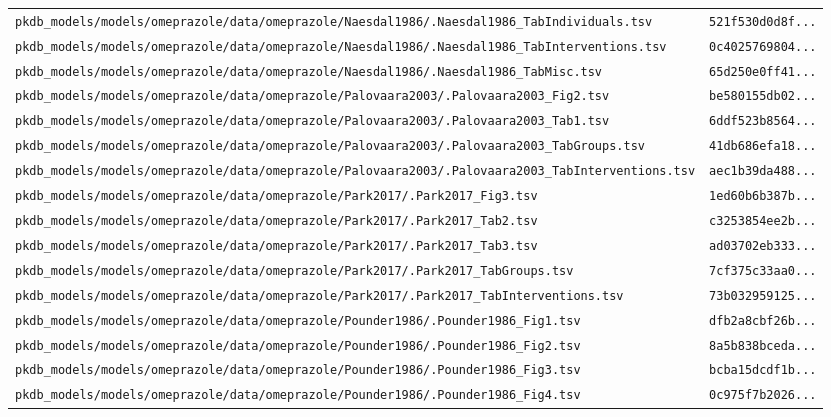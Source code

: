 \begin{longtable}{ll}
\texttt{pkdb\_models/models/omeprazole/data/omeprazole/Naesdal1986/.Naesdal1986\_TabIndividuals.tsv} & \texttt{521f530d0d8f...} \\
\texttt{pkdb\_models/models/omeprazole/data/omeprazole/Naesdal1986/.Naesdal1986\_TabInterventions.tsv} & \texttt{0c4025769804...} \\
\texttt{pkdb\_models/models/omeprazole/data/omeprazole/Naesdal1986/.Naesdal1986\_TabMisc.tsv} & \texttt{65d250e0ff41...} \\
\texttt{pkdb\_models/models/omeprazole/data/omeprazole/Palovaara2003/.Palovaara2003\_Fig2.tsv} & \texttt{be580155db02...} \\
\texttt{pkdb\_models/models/omeprazole/data/omeprazole/Palovaara2003/.Palovaara2003\_Tab1.tsv} & \texttt{6ddf523b8564...} \\
\texttt{pkdb\_models/models/omeprazole/data/omeprazole/Palovaara2003/.Palovaara2003\_TabGroups.tsv} & \texttt{41db686efa18...} \\
\texttt{pkdb\_models/models/omeprazole/data/omeprazole/Palovaara2003/.Palovaara2003\_TabInterventions.tsv} & \texttt{aec1b39da488...} \\
\texttt{pkdb\_models/models/omeprazole/data/omeprazole/Park2017/.Park2017\_Fig3.tsv} & \texttt{1ed60b6b387b...} \\
\texttt{pkdb\_models/models/omeprazole/data/omeprazole/Park2017/.Park2017\_Tab2.tsv} & \texttt{c3253854ee2b...} \\
\texttt{pkdb\_models/models/omeprazole/data/omeprazole/Park2017/.Park2017\_Tab3.tsv} & \texttt{ad03702eb333...} \\
\texttt{pkdb\_models/models/omeprazole/data/omeprazole/Park2017/.Park2017\_TabGroups.tsv} & \texttt{7cf375c33aa0...} \\
\texttt{pkdb\_models/models/omeprazole/data/omeprazole/Park2017/.Park2017\_TabInterventions.tsv} & \texttt{73b032959125...} \\
\texttt{pkdb\_models/models/omeprazole/data/omeprazole/Pounder1986/.Pounder1986\_Fig1.tsv} & \texttt{dfb2a8cbf26b...} \\
\texttt{pkdb\_models/models/omeprazole/data/omeprazole/Pounder1986/.Pounder1986\_Fig2.tsv} & \texttt{8a5b838bceda...} \\
\texttt{pkdb\_models/models/omeprazole/data/omeprazole/Pounder1986/.Pounder1986\_Fig3.tsv} & \texttt{bcba15dcdf1b...} \\
\texttt{pkdb\_models/models/omeprazole/data/omeprazole/Pounder1986/.Pounder1986\_Fig4.tsv} & \texttt{0c975f7b2026...} \\

\end{longtable}
